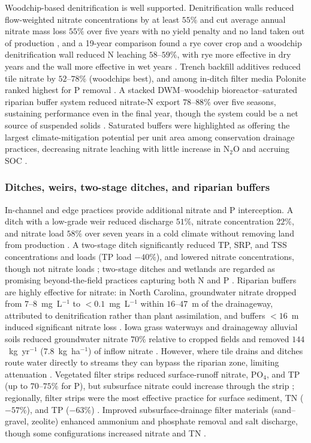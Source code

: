 \documentclass[11pt]{article}
\begin{document}
Woodchip-based denitrification is well supported. Denitrification walls
reduced flow-weighted nitrate concentrations by at least $55\%$ and cut
average annual nitrate mass loss $55\%$ over five years with no yield
penalty and no land taken out of production \parencite{Jaynes2008}, and a
19-year comparison found a rye cover crop and a woodchip denitrification
wall reduced N leaching $58$--$59\%$, with rye more effective in dry years
and the wall more effective in wet years \parencite{Rogovska2023}. Trench
backfill additives reduced tile nitrate by $52$--$78\%$ (woodchips best),
and among in-ditch filter media Polonite ranked highest for P removal
\parencite{Povilaitis2018}. A stacked DWM--woodchip bioreactor--saturated
riparian buffer system reduced nitrate-N export $78$--$88\%$ over five
seasons, sustaining performance even in the final year, though the system
could be a net source of suspended solids \parencite{Singh2024b}. Saturated
buffers were highlighted as offering the largest climate-mitigation
potential per unit area among conservation drainage practices, decreasing
nitrate leaching with little increase in N$_2$O and accruing SOC
\parencite{Hall2025}.

\subsubsection{Ditches, weirs, two-stage ditches, and riparian buffers}

In-channel and edge practices provide additional nitrate and P
interception. A ditch with a low-grade weir reduced discharge $51\%$,
nitrate concentration $22\%$, and nitrate load $58\%$ over seven years in a
cold climate without removing land from production \parencite{Strock2025b}.
A two-stage ditch significantly reduced TP, SRP, and TSS concentrations and
loads (TP load $-40\%$), and lowered nitrate concentrations, though not
nitrate loads \parencite{Hodaj2017}; two-stage ditches and wetlands are
regarded as promising beyond-the-field practices capturing both N and P
\parencite{Kalcic2018}. Riparian buffers are highly effective for nitrate:
in North Carolina, groundwater nitrate dropped from $7$--$8$~mg~L$^{-1}$ to
$<0.1$~mg~L$^{-1}$ within $16$--$47$~m of the drainageway, attributed to
denitrification rather than plant assimilation, and buffers $<16$~m
induced significant nitrate loss \parencite{JACOBS1985}. Iowa grass
waterways and drainageway alluvial soils reduced groundwater nitrate $70\%$
relative to cropped fields and removed $144$~kg~yr$^{-1}$
($7.8$~kg~ha$^{-1}$) of inflow nitrate \parencite{Schilling2022}. However,
where tile drains and ditches route water directly to streams they can
bypass the riparian zone, limiting attenuation \parencite{Puckett2005}.
Vegetated filter strips reduced surface-runoff nitrate, PO$_4$, and TP (up
to $70$--$75\%$ for P), but subsurface nitrate could increase through the
strip \parencite{Bhattarai2009}; regionally, filter strips were the most
effective practice for surface sediment, TN ($-57\%$), and TP ($-63\%$)
\parencite{Yuan2022}. Improved subsurface-drainage filter materials
(sand--gravel, zeolite) enhanced ammonium and phosphate removal and salt
discharge, though some configurations increased nitrate and TN
\parencite{Tao2019b,Tao2022,Tao2025b,Wang2024e}.
\end{document}
